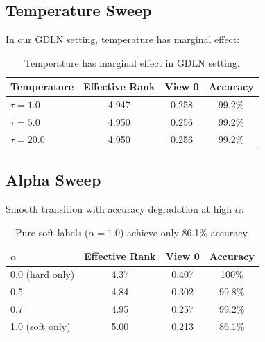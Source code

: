 \documentclass{article}
\begin{document}
\subsection{Temperature Sweep}

In our GDLN setting, temperature has marginal effect:

\begin{table}[h]
\centering
\begin{tabular}{@{}lccc@{}}
\toprule
Temperature & Effective Rank & View 0 & Accuracy \\
\midrule
$\tau = 1.0$ & 4.947 & 0.258 & 99.2\% \\
$\tau = 5.0$ & 4.950 & 0.256 & 99.2\% \\
$\tau = 20.0$ & 4.950 & 0.256 & 99.2\% \\
\bottomrule
\end{tabular}
\caption{Temperature has marginal effect in GDLN setting.}
\end{table}

\subsection{Alpha Sweep}

Smooth transition with accuracy degradation at high $\alpha$:

\begin{table}[h]
\centering
\begin{tabular}{@{}lccc@{}}
\toprule
$\alpha$ & Effective Rank & View 0 & Accuracy \\
\midrule
0.0 (hard only) & 4.37 & 0.407 & 100\% \\
0.5 & 4.84 & 0.302 & 99.8\% \\
0.7 & 4.95 & 0.257 & 99.2\% \\
1.0 (soft only) & 5.00 & 0.213 & 86.1\% \\
\bottomrule
\end{tabular}
\caption{Pure soft labels ($\alpha=1.0$) achieve only 86.1\% accuracy.}
\end{table}
\end{document}
